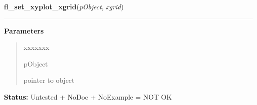     \label{xformslib:library:fl_set_xyplot_xgrid}

    \vspace{0.5ex}

\hspace{.8\funcindent}\begin{boxedminipage}{\funcwidth}

    \raggedright \textbf{fl\_set\_xyplot\_xgrid}(\textit{pObject}, \textit{xgrid})

    \vspace{-1.5ex}

    \rule{\textwidth}{0.5\fboxrule}
\setlength{\parskip}{2ex}
\setlength{\parskip}{1ex}
      \textbf{Parameters}
      \vspace{-1ex}

      \begin{quote}
        \begin{Ventry}{xxxxxxx}

          \item[pObject]

          pointer to object

        \end{Ventry}

      \end{quote}

\textbf{Status:} Untested + NoDoc + NoExample = NOT OK



    \end{boxedminipage}

    \label{xformslib:library:fl_set_xyplot_ygrid}

    \vspace{0.5ex}

